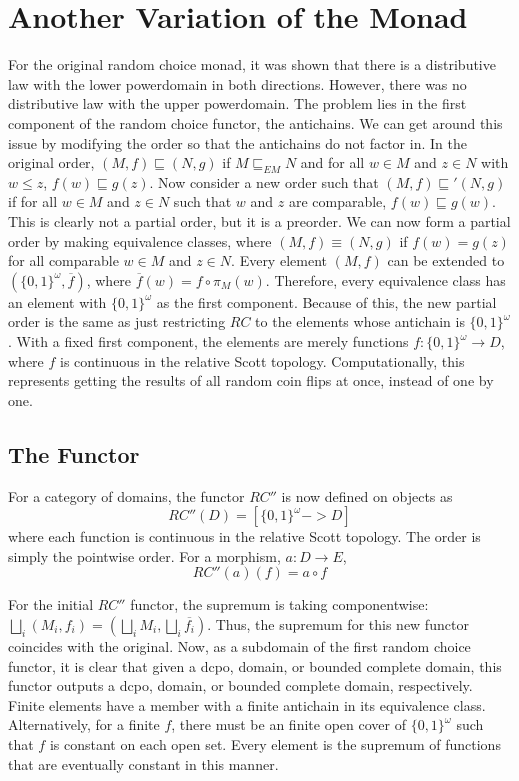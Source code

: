 \section{Another Variation of the Monad} \label{monadvariation}

For the original random choice monad, it was shown that there is a distributive law with the lower powerdomain in both directions.  However, there was no distributive law with the upper powerdomain.  The problem lies in the first component of the random choice functor, the antichains.  We can get around this issue by modifying the order so that the antichains do not factor in.  In the original order, $(M,f) \sqsubseteq (N,g)$ if $M\sqsubseteq_{EM} N$ and for all $w\in M$ and $z\in N$ with $w\leq z$, $f(w)\sqsubseteq g(z)$.  Now consider a new order such that $(M,f) \sqsubseteq' (N,g)$ if for all $w\in M$ and $z\in N$ such that $w$ and $z$ are comparable, $f(w) \sqsubseteq g(w)$.  This is clearly not a partial order, but it is a preorder.  We can now form a partial order by making equivalence classes, where $(M,f)\equiv (N,g)$ if $f(w)=g(z)$ for all comparable $w\in M$ and $z\in N$.  Every element $(M,f)$ can be extended to $(\{0,1\}^\omega, \overline{f})$, where $\overline{f}(w) = f\circ \pi_M(w)$.  Therefore, every equivalence class has an element with $\{0,1\}^\omega$ as the first component.  Because of this, the new partial order is the same as just restricting $RC$ to the elements whose antichain is $\{0,1\}^\omega$.  With a fixed first component, the elements are merely functions $f:\{0,1\}^\omega\to D$, where $f$ is continuous in the relative Scott topology. Computationally, this represents getting the results of all random coin flips at once, instead of one by one.

\subsection{The Functor}

\begin{definition}
For a category of domains, the functor $RC''$ is now defined on objects as  \[RC''(D) = [\{0,1\}^\omega -> D]\] where each function is continuous in the relative Scott topology. The order is simply the pointwise order.  For a morphism, $a:D\to E$,
\[RC''(a)(f) = a\circ f\]
\end{definition}
For the initial $RC''$ functor, the supremum is taking componentwise:  $\bigsqcup_i (M_i, f_i) = (\bigsqcup_i M_i, \bigsqcup_i \overline{f_i})$.  Thus, the supremum for this new functor coincides with the original.  Now, as a subdomain of the first random choice functor, it is clear that given a dcpo, domain, or bounded complete domain, this functor outputs a dcpo, domain, or bounded complete domain, respectively.  Finite elements have a member with a finite antichain in its equivalence class.  Alternatively, for a finite $f$, there must be an finite open cover of $\{0,1\}^\omega$ such that $f$ is constant on each open set.  Every element is the supremum of functions that are eventually constant in this manner.


